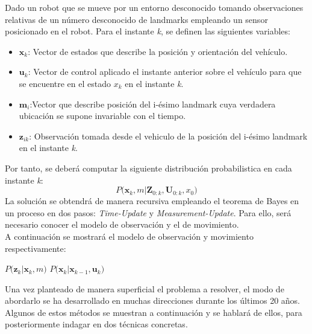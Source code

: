 Dado un robot que se mueve por un entorno desconocido tomando observaciones relativas de un número desconocido de landmarks empleando un sensor posicionado
en el robot. Para el instante \textit{k}, se definen las siguientes variables:
\begin{itemize}
    \item $\textbf{x}_k$: Vector de estados que describe la posición y orientación del vehículo.
    \item $\textbf{u}_k$: Vector de control aplicado el instante anterior sobre el vehículo para que se encuentre
en el estado $\textit{x}_k$ en el instante \textit{k}.
    \item $\textbf{m}_i$:Vector que describe posición del i-ésimo landmark cuya verdadera ubicación se supone invariable con el tiempo.
    \item $\textbf{z}_{ik}$: Observación tomada desde el vehiculo de la posición del i-ésimo landmark en el instante \textit{k}.
\end{itemize}
Por tanto, se deberá computar la siguiente distribución probabilistica en cada instante \textit{k}:
\begin{equation}
    P\Big( \textbf{x}_k ,m | \textbf{Z}_{0:k},\textbf{U}_{0:k},x_0\Big)
\end{equation}
La solución se obtendrá de manera recursiva empleando el teorema de Bayes en un proceso en dos pasos: \textit{Time-Update} y \textit{Measurement-Update}. Para ello,
será necesario conocer el modelo de observación y el de movimiento. \\
A continuación se mostrará el modelo de observación y movimiento respectivamente:
\begin{center}
    $P\Big( \textbf{z}_k | \textbf{x}_{k},m \Big)$ \hspace{2cm} $P\Big( \textbf{x}_k | \textbf{x}_{k-1},\textbf{u}_{k} \Big)$
\end{center}

Una vez planteado de manera superficial el problema a resolver, el modo de abordarlo se ha desarrollado en muchas direcciones durante los últimos 20 años. \\
Algunos de estos métodos se muestran a continuación y se hablará de ellos, para posteriormente indagar en dos técnicas concretas.
